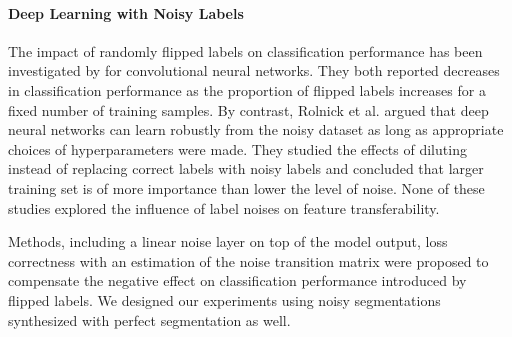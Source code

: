 
\paragraph{Deep Learning with Noisy Labels}

The impact of randomly flipped labels on classification performance has been investigated by \cite{sukhbaatar2014training,patrini2016making} for convolutional neural networks.
They both reported decreases in classification performance as the proportion of flipped labels increases for a fixed number of training samples.
By contrast, Rolnick et al.\cite{rolnick2017deep} argued that deep neural networks can learn robustly from the noisy dataset as long as appropriate choices of hyperparameters were made.
They studied the effects of diluting instead of replacing correct labels with noisy labels and concluded that larger training set is of more importance than lower the level of noise.
None of these studies explored the influence of label noises on feature transferability.

Methods, including a linear noise layer on top of the model output\cite{sukhbaatar2014training}, loss correctness with an estimation of the noise transition matrix\cite{patrini2016making} were proposed to compensate the negative effect on classification performance introduced by flipped labels.
We designed our experiments using noisy segmentations synthesized with perfect segmentation as well.


